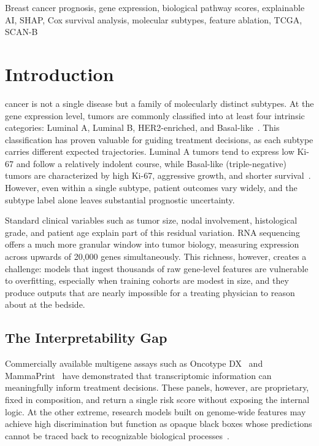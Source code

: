 \documentclass[journal]{IEEEtran}
\begin{document}
\begin{IEEEkeywords}
Breast cancer prognosis, gene expression, biological pathway scores, explainable AI, SHAP, Cox survival analysis, molecular subtypes, feature ablation, TCGA, SCAN-B
\end{IEEEkeywords}


\section{Introduction}
\label{sec:intro}

 cancer is not a single disease but a family of molecularly distinct subtypes. At the gene expression level, tumors are commonly classified into at least four intrinsic categories: Luminal A, Luminal B, HER2-enriched, and Basal-like~\cite{tcga2012}. This classification has proven valuable for guiding treatment decisions, as each subtype carries different expected trajectories. Luminal A tumors tend to express low Ki-67 and follow a relatively indolent course, while Basal-like (triple-negative) tumors are characterized by high Ki-67, aggressive growth, and shorter survival~\cite{dowsett2011}. However, even within a single subtype, patient outcomes vary widely, and the subtype label alone leaves substantial prognostic uncertainty.

Standard clinical variables such as tumor size, nodal involvement, histological grade, and patient age explain part of this residual variation. RNA sequencing offers a much more granular window into tumor biology, measuring expression across upwards of 20,000 genes simultaneously. This richness, however, creates a challenge: models that ingest thousands of raw gene-level features are vulnerable to overfitting, especially when training cohorts are modest in size, and they produce outputs that are nearly impossible for a treating physician to reason about at the bedside.

\subsection{The Interpretability Gap}

Commercially available multigene assays such as Oncotype DX~\cite{paik2004} and MammaPrint~\cite{vantveer2002,cardoso2016} have demonstrated that transcriptomic information can meaningfully inform treatment decisions. These panels, however, are proprietary, fixed in composition, and return a single risk score without exposing the internal logic. At the other extreme, research models built on genome-wide features may achieve high discrimination but function as opaque black boxes whose predictions cannot be traced back to recognizable biological processes~\cite{rudin2019}.
\end{document}
